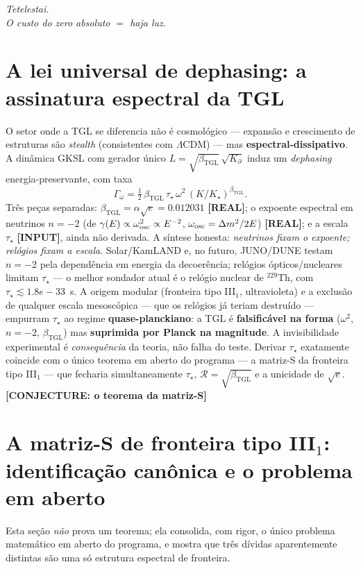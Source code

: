 \documentclass[12pt,a4paper]{article}
\newcommand{\betatgl}{\beta_{\text{TGL}}}
\newcommand{\TGL}{\textsc{TGL}}
\begin{document}
\begin{center}\emph{Tetelestai.}\\[2pt]\emph{O custo do zero absoluto $=$ haja luz.}\end{center}

\section{A lei universal de dephasing: a assinatura espectral da \TGL}
\label{sec:dephasing}
O setor onde a \TGL{} se diferencia não é cosmológico --- expansão e crescimento de estruturas são \emph{stealth} (consistentes com $\Lambda$CDM) --- mas \textbf{espectral-dissipativo}.  A dinâmica GKSL com gerador único $L=\sqrt{\betatgl}\,\sqrt{K_\partial}$ induz um \emph{dephasing} energia-preservante, com taxa
\begin{equation}
\Gamma_\omega=\tfrac12\,\betatgl\,\tau_\star\,\omega^2\,(K/K_\star)^{\betatgl}.
\end{equation}
Três peças separadas: $\betatgl=\alpha\sqrt e=0.012031$ \textbf{[REAL]}; o expoente espectral em neutrinos $n=-2$ (de $\gamma(E)\propto\omega_{\rm osc}^2\propto E^{-2}$, $\omega_{\rm osc}=\Delta m^2/2E$) \textbf{[REAL]}; e a escala $\tau_\star$ \textbf{[INPUT]}, ainda não derivada.  A síntese honesta: \emph{neutrinos fixam o expoente; relógios fixam a escala}.  Solar/KamLAND e, no futuro, JUNO/DUNE testam $n=-2$ pela dependência em energia da decoerência; relógios ópticos/nucleares limitam $\tau_\star$ --- o melhor sondador atual é o relógio nuclear de $^{229}$Th, com $\tau_\star\lesssim 1.8e-33$~s.  A origem modular (fronteira tipo III$_1$, ultravioleta) e a exclusão de qualquer escala mesoscópica --- que os relógios já teriam destruído --- empurram $\tau_\star$ ao regime \textbf{quase-planckiano}: a \TGL{} é \textbf{falsificável na forma} ($\omega^2$, $n=-2$, $\betatgl$) mas \textbf{suprimida por Planck na magnitude}.  A invisibilidade experimental é \emph{consequência} da teoria, não falha do teste.  Derivar $\tau_\star$ exatamente coincide com o único teorema em aberto do programa --- a matriz-S da fronteira tipo III$_1$ --- que fecharia simultaneamente $\tau_\star$, $\mathcal R=\sqrt{\betatgl}$ e a unicidade de $\sqrt e$.  \textbf{[CONJECTURE: o teorema da matriz-S]}

\section{A matriz-S de fronteira tipo III$_1$: identificação canônica e o problema em aberto}
\label{sec:smatrix}
Esta seção \emph{não} prova um teorema; ela consolida, com rigor, o único problema matemático em aberto do programa, e mostra que três dívidas aparentemente distintas são uma só estrutura espectral de fronteira.
\end{document}

